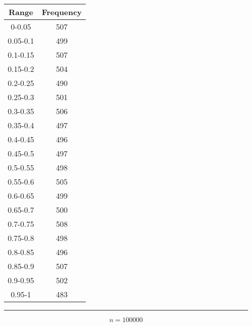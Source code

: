 \begin{center} \begin{tabular}{||c | c||}  \hline
Range & Frequency \\ [0.5ex] \hline \hline0-0.05 & 507\\
 \hline 
0.05-0.1 & 499\\
 \hline 
0.1-0.15 & 507\\
 \hline 
0.15-0.2 & 504\\
 \hline 
0.2-0.25 & 490\\
 \hline 
0.25-0.3 & 501\\
 \hline 
0.3-0.35 & 506\\
 \hline 
0.35-0.4 & 497\\
 \hline 
0.4-0.45 & 496\\
 \hline 
0.45-0.5 & 497\\
 \hline 
0.5-0.55 & 498\\
 \hline 
0.55-0.6 & 505\\
 \hline 
0.6-0.65 & 499\\
 \hline 
0.65-0.7 & 500\\
 \hline 
0.7-0.75 & 508\\
 \hline 
0.75-0.8 & 498\\
 \hline 
0.8-0.85 & 496\\
 \hline 
0.85-0.9 & 507\\
 \hline 
0.9-0.95 & 502\\
 \hline 
0.95-1 & 483\\
 \hline 
\end{tabular} 
 \end{center}

 \noindent\rule[0.5ex]{\linewidth}{1pt}



$$n= 100000$$

